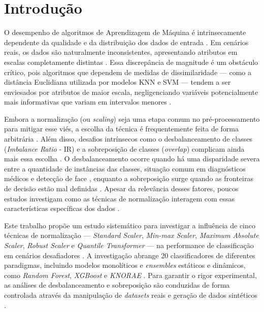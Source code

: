 	\tableofcontents
    \setcounter{page}{2}
	\newpage
    
\section{Introdução}

O desempenho de algoritmos de Aprendizagem de Máquina é intrinsecamente dependente da qualidade e da distribuição dos dados de entrada \cite{Projeto2025}. Em cenários reais, os dados são naturalmente inconsistentes, apresentando atributos em escalas completamente distintas \cite{Projeto2025}. Essa discrepância de magnitude é um obstáculo crítico, pois algoritmos que dependem de medidas de dissimilaridade — como a distância Euclidiana utilizada por modelos KNN e SVM — tendem a ser enviesados por atributos de maior escala, negligenciando variáveis potencialmente mais informativas que variam em intervalos menores \cite{Projeto2025, Amorim2023}.

Embora a normalização (ou \textit{scaling}) seja uma etapa comum no pré-processamento para mitigar esse viés, a escolha da técnica é frequentemente feita de forma arbitrária \cite{Projeto2025, Amorim2023}. Além disso, desafios intrínsecos como o desbalanceamento de classes (\textit{Imbalance Ratio} - IR) e a sobreposição de classes (\textit{overlap}) complicam ainda mais essa escolha \cite{Projeto2025, Amorim2023}. O desbalanceamento ocorre quando há uma disparidade severa entre a quantidade de instâncias das classes, situação comum em diagnósticos médicos e detecção de face \cite{Projeto2025, Amorim2023}, enquanto a sobreposição surge quando as fronteiras de decisão estão mal definidas \cite{Projeto2025, Vuttipittayamongkol2021}. Apesar da relevância desses fatores, poucos estudos investigam como as técnicas de normalização interagem com essas características específicas dos dados \cite{Projeto2025, Amorim2023}.

Este trabalho propõe um estudo sistemático para investigar a influência de cinco técnicas de normalização — \textit{Standard Scaler}, \textit{Min-max Scaler}, \textit{Maximum Absolute Scaler}, \textit{Robust Scaler} e \textit{Quantile Transformer} — na performance de classificação em cenários desafiadores \cite{Projeto2025, Amorim2023}. A investigação abrange 20 classificadores de diferentes paradigmas, incluindo modelos monolíticos e \textit{ensembles} estáticos e dinâmicos, como \textit{Random Forest}, \textit{XGBoost} e \textit{KNORAE} \cite{Projeto2025, Amorim2023}. Para garantir o rigor experimental, as análises de desbalanceamento e sobreposição são conduzidas de forma controlada através da manipulação de \textit{datasets} reais e geração de dados sintéticos \cite{Projeto2025}.

